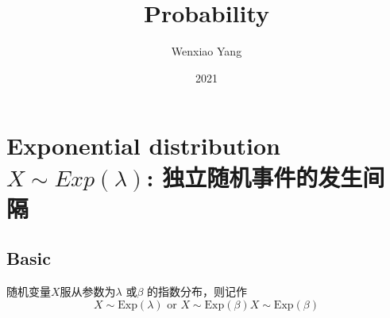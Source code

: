 \documentclass[11pt,a4paper]{article}
\title{Probability}
\author[*]{Wenxiao Yang}
\affil[*]{Department of Mathematics, University of Illinois at Urbana-Champaign}
\date{2021}
\begin{document}
\maketitle
\tableofcontents
\newpage

\section{Exponential distribution $X\sim Exp(\lambda)$: 独立随机事件的发生间隔}
\subsection{Basic}
随机变量$X$服从参数为$\lambda$ 或$\beta$ 的指数分布，则记作
$${\displaystyle X\sim {\text{Exp}}(\lambda )} \text{ or } {\displaystyle X\sim {\text{Exp}}(\beta )}{\displaystyle X\sim {\text{Exp}}(\beta )}$$
\end{document}
